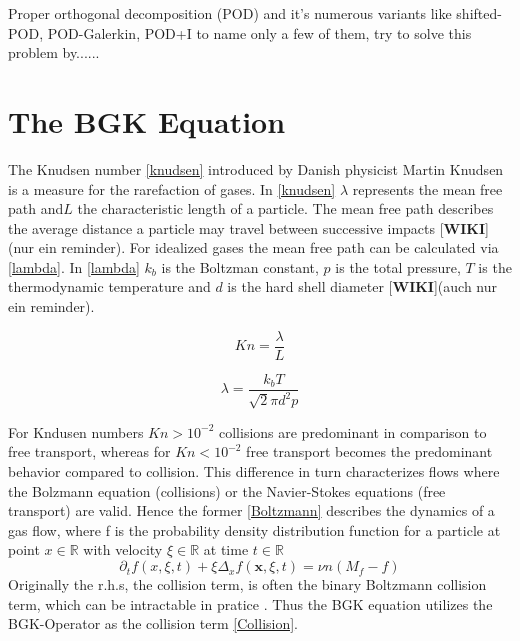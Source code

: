 \documentclass[12pt, a4paper]{article}
\begin{document}
Proper orthogonal decomposition (POD) and it's numerous variants like shifted-POD\cite{bibid}, POD-Galerkin\cite{bibid}, POD+I \cite{bibid} to name only a few of them, try to solve this problem by......

	
\section{The BGK Equation}\label{Sec: BGK}
The Knudsen number \cref{knudsen} introduced by Danish physicist Martin Knudsen is a measure for the rarefaction of gases. In \cref{knudsen} $\lambda$ represents the mean free path and\(L\) the characteristic length \cite{Bernard} of a particle. The mean free path  describes the average distance a particle may travel between successive impacts [\textbf{WIKI}](nur ein reminder). For idealized gases the mean free path can be calculated via \cref{lambda}. In \cref{lambda} $k_b$ is the Boltzman constant, \(p\) is the total pressure, \(T\) is the thermodynamic temperature and \(d\) is the hard shell diameter [\textbf{WIKI}](auch nur ein reminder).\\
\noindent\begin{minipage}{.5\linewidth}
	\begin{equation}
		Kn = \frac{\lambda}{L}
		\label{knudsen}
\end{equation}
\end{minipage}%
\begin{minipage}{.5\linewidth}
	\begin{equation}
		\lambda = \frac{k_bT}{\sqrt{2}\pi d^2p}
		\label{lambda}
\end{equation}
\end{minipage}
For Kndusen numbers $Kn > 10^{-2}$ collisions are predominant in comparison to free transport, whereas for $Kn < 10^{-2}$ free transport becomes the predominant behavior compared to collision\cite{Bernard}. This difference in turn characterizes flows where the Bolzmann equation (collisions) or the Navier-Stokes equations (free transport) are valid. Hence the former \cref{Boltzmann} describes the dynamics of a gas flow, where f is the probability density distribution function for a particle at point $x \in \mathbb{R}$ with velocity $\xi \in \mathbb{R}$ at time $t \in \mathbb{R}$
\begin{equation}	\partial_t f(x, \xi, t) + \xi \Delta_x f(\textbf{x},\xi,t) = \nu n (M_f - f)
	\label{Boltzmann}
\end{equation}
Originally the r.h.s, the collision term, is often the binary Boltzmann collision term, which can be intractable in pratice \cite{BGK}. Thus the BGK equation utilizes the BGK-Operator as the collision term \cref{Collision}\cite{Bernard}.
\end{document}
